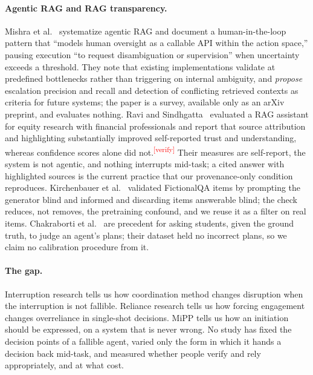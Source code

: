 \documentclass[sigconf,nonacm]{acmart}
\newcommand{\verify}{\textsuperscript{\textcolor{red}{[verify]}}}
\begin{document}
\paragraph{Agentic RAG and RAG transparency.}
Mishra et al.~\cite{mishra2026} systematize agentic RAG and document a
human-in-the-loop pattern that ``models human oversight as a callable API
within the action space,'' pausing execution ``to request disambiguation
or supervision'' when uncertainty exceeds a threshold. They note that
existing implementations validate at predefined bottlenecks rather than
triggering on internal ambiguity, and \emph{propose} escalation precision
and recall and detection of conflicting retrieved contexts as criteria
for future systems; the paper is a survey, available only as an arXiv
preprint, and evaluates nothing. Ravi and Sindhgatta~\cite{ravi2025}
evaluated a RAG assistant for equity research with financial
professionals and report that source attribution and highlighting
substantially improved self-reported trust and understanding, whereas
confidence scores alone did not.\verify{}
Their measures are self-report, the system is not agentic, and nothing
interrupts mid-task; a cited answer with highlighted sources is the current
practice that our provenance-only condition reproduces. Kirchenbauer et
al.~\cite{kirchenbauer2026} validated FictionalQA items by prompting the
generator blind and informed and discarding items answerable blind; the
check reduces, not removes, the pretraining confound, and we reuse it as a
filter on real items. Chakraborti et al.~\cite{chakraborti2019} are
precedent for asking students, given the ground truth, to judge an agent's
plans; their dataset held no incorrect plans, so we claim no calibration
procedure from it.

\paragraph{The gap.}
Interruption research tells us how coordination method changes disruption
when the interruption is not fallible. Reliance research tells us how
forcing engagement changes overreliance in single-shot decisions. MiPP
tells us how an initiation should be expressed, on a system that is never
wrong. No study has fixed the decision points of a fallible agent, varied
only the form in which it hands a decision back mid-task, and measured
whether people verify and rely appropriately, and at what cost.
\end{document}
